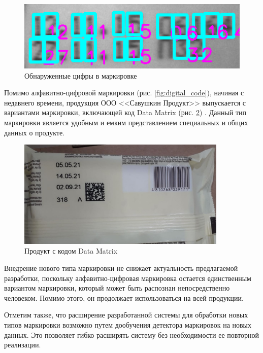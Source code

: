 \begin{figure}[!ht]
	\centering
	\includegraphics[width=12cm]{man-source/images/ch4/pic4-26.png}
	\caption{Обнаруженные цифры в маркировке}
	\label{fig:numbers_detect}
\end{figure}

Помимо алфавитно-цифровой маркировки (рис. \ref{fig:digital_code}), начиная с недавнего времени, продукция ООО <<Савушкин Продукт>> выпускается с вариантами маркировки, включающей код Data Matrix (рис. \ref{fig:data_matrix}) \cite{milk}. Данный тип маркировки является удобным и емким представлением специальных и общих данных о продукте. 


\begin{figure}[!ht]
	\centering
	\includegraphics[width=10cm]{man-source/images/ch4/pic4-2.jpg}
	\caption{Продукт с кодом Data Matrix}
	\label{fig:data_matrix}
\end{figure}

Внедрение нового типа маркировки не снижает актуальность предлагаемой разработки, поскольку алфавитно-цифровая маркировка остается единственным вариантом маркировки, который может быть распознан непосредственно человеком. Помимо этого, он продолжает использоваться на всей продукции.

Отметим также, что расширение разработанной системы для обработки новых типов маркировки возможно путем дообучения детектора маркировок на новых данных. Это позволяет гибко расширять систему без необходимости ее повторной реализации.

